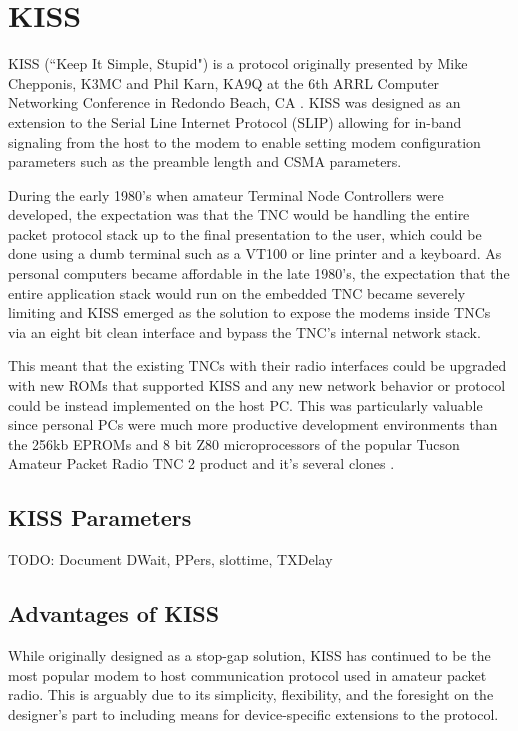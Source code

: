 \chapter{KISS}

KISS (``Keep It Simple, Stupid") is a protocol originally presented by 
Mike Chepponis, K3MC and Phil Karn, KA9Q at the 6th ARRL Computer Networking
Conference in Redondo Beach, CA \cite{KISSspec}.
KISS was designed as an extension to the Serial Line 
Internet Protocol (SLIP) allowing for in-band signaling from 
the host to the modem to enable setting modem 
configuration parameters such as the preamble length and CSMA parameters.

During the early 1980's when amateur Terminal Node Controllers were developed,
the expectation was that the TNC would be handling 
the entire packet protocol stack up to the final presentation to the user, which
could be done using a dumb terminal such as a VT100 or line printer 
and a keyboard. 
As personal computers became affordable in the late 1980's, the expectation that
the entire application stack would run on the embedded TNC became severely limiting
and KISS emerged as the solution to expose the modems inside TNCs via 
an eight bit clean interface and bypass the TNC's internal network stack.

This meant that the existing TNCs with their radio interfaces could
be upgraded with new ROMs that supported KISS and any new network behavior
or protocol could be instead implemented on the host PC.
This was particularly valuable since personal PCs were much
more productive development environments than the 256kb EPROMs and 8 bit
Z80 microprocessors of the popular Tucson Amateur Packet Radio TNC 2 product
and it's several clones \cite{TNC2manual}.

\section{KISS Parameters}
\label{sec:kissparm}

TODO: Document DWait, PPers, slottime, TXDelay

\section{Advantages of KISS}

While originally designed as a stop-gap solution, KISS has continued to be 
the most popular modem to host communication protocol used in amateur packet radio.
This is arguably due to its simplicity, flexibility,
and the foresight on the designer's part
to including means for device-specific extensions to the protocol.


